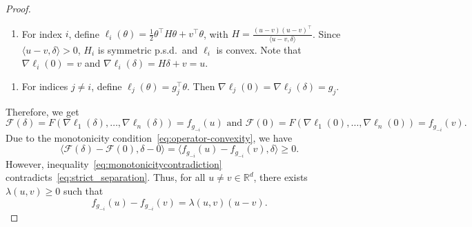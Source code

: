 \documentclass[10pt,a4paper]{amsart}
\newcommand{\F}{\mathcal{F}}
\newcommand{\R}{\mathbb{R}}
\begin{document}
\begin{proof}
    \begin{enumerate}[label=$\spadesuit$, ref=($\spadesuit$)]
        \item\label{item:def_R_i} For index $i$, define $\ell_i(\theta) = \frac{1}{2} \theta^\intercal H \theta + v^\intercal \theta$, with $H = \frac{(u-v) (u-v)^\intercal}{\langle u-v, \delta \rangle}$. 
        Since $\langle u-v, \delta \rangle > 0$, $H_i$ is symmetric p.s.d.\ and $\ell_i$ is convex.
        Note that $\nabla \ell_i(0) = v$ and $\nabla \ell_i(\delta) = H \delta + v  = u$.
    \end{enumerate}
    \begin{enumerate}[label=$\clubsuit$, ref=($\clubsuit$)]
        \item\label{item:def_R_j} For indices $j \neq i$, define $\ell_j(\theta) = g_j^\intercal \theta$. 
        Then $\nabla \ell_j(0) = \nabla \ell_j(\delta) = g_j$.
    \end{enumerate}
    Therefore, we get 
    \[
        \F(\delta) = F(\nabla \ell_1(\delta), \ldots, \nabla \ell_n(\delta)) = f_{g_{-i}}(u) \text{ and } \F(0) = F(\nabla \ell_1(0), \ldots, \nabla \ell_n(0)) = f_{g_{-i}}(v).
    \]
    Due to the monotonicity condition~\eqref{eq:operator-convexity}, we have
    \begin{equation}\label{eq:monotonicitycontradiction}
        \langle \F(\delta) - \F(0), \delta - 0 \rangle = \langle f_{g_{-i}}(u) - f_{g_{-i}}(v), \delta \rangle \geq 0.
    \end{equation}
    However, inequality~\eqref{eq:monotonicitycontradiction} contradicts~\eqref{eq:strict_separation}. 
    Thus, for all $u \neq v \in \R^d$, there exists $\lambda(u, v) \geq 0$ such that
    \begin{equation}\label{eq:positivedirectional}
        f_{g_{-i}}(u) - f_{g_{-i}}(v) = \lambda(u,v)(u-v).
    \end{equation}



\end{proof}
\end{document}
